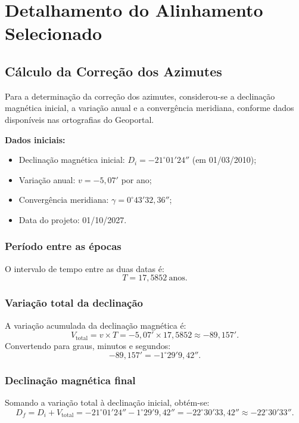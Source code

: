 \chapter{Detalhamento do Alinhamento Selecionado}

\section{Cálculo da Correção dos Azimutes}

Para a determinação da correção dos azimutes, considerou-se a declinação magnética inicial, a variação anual e a convergência meridiana, conforme dados disponíveis nas ortografias do Geoportal.



\textbf{Dados iniciais:}
\begin{itemize}
	\item Declinação magnética inicial: $D_i = -21^\circ 01'24''$ (em 01/03/2010);
	\item Variação anual: $v = -5{,}07'$ por ano;
	\item Convergência meridiana: $\gamma = 0^\circ 43'32{,}36''$;
	\item Data do projeto: 01/10/2027.
\end{itemize}

\subsection*{Período entre as épocas}
O intervalo de tempo entre as duas datas é:
\[
T = 17{,}5852\ \text{anos}.
\]

\subsection*{Variação total da declinação}
A variação acumulada da declinação magnética é:
\[
V_{\text{total}} = v \times T = -5{,}07' \times 17{,}5852 \approx -89{,}157' .
\]
Convertendo para graus, minutos e segundos:
\[
-89{,}157' = -1^\circ 29'9{,}42''.
\]

\subsection*{Declinação magnética final}
Somando a variação total à declinação inicial, obtém-se:
\[
D_f = D_i + V_{\text{total}} = -21^\circ 01'24'' - 1^\circ 29'9{,}42'' = -22^\circ 30'33{,}42'' \approx -22^\circ 30'33''.
\]

